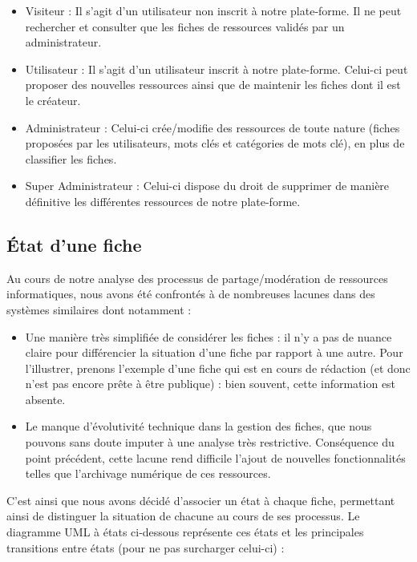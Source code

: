 \begin{itemize}
    \item Visiteur : Il s'agit d'un utilisateur non inscrit à notre plate-forme. Il ne peut rechercher et consulter que les fiches de ressources validés par un administrateur.
    \item Utilisateur : Il s'agit d'un utilisateur  inscrit à notre plate-forme. Celui-ci peut proposer des nouvelles ressources ainsi que de maintenir les fiches dont il est le créateur.
    \item Administrateur : Celui-ci crée/modifie des ressources de toute nature (fiches proposées par les utilisateurs, mots clés et catégories de mots clé), en plus de classifier les fiches.
    \item Super Administrateur : Celui-ci dispose du droit de supprimer de manière définitive les différentes ressources de notre plate-forme.
\end{itemize}



\subsection*{État d'une fiche}

Au cours de notre analyse des processus de partage/modération de ressources informatiques, nous avons été confrontés à de nombreuses lacunes dans des systèmes similaires dont notamment :
\begin{itemize}
    \item Une manière très simplifiée de considérer les fiches : il n'y a pas de nuance claire pour différencier la situation d'une fiche par rapport à une autre. Pour l'illustrer, prenons l'exemple d'une fiche qui est en cours de rédaction (et donc n'est pas encore prête à être publique) : bien souvent, cette information est absente.
    \item Le manque d'évolutivité technique dans la gestion des fiches, que nous pouvons sans doute imputer à une analyse très restrictive. Conséquence du point précédent, cette lacune rend difficile l'ajout de nouvelles fonctionnalités telles que l'archivage numérique de ces ressources. 
\end{itemize}

C'est ainsi que nous avons décidé d'associer un état à chaque fiche, permettant ainsi de distinguer la situation de chacune au cours de ses processus. Le diagramme UML à états ci-dessous représente ces états et les principales transitions entre états (pour ne pas surcharger celui-ci) :

